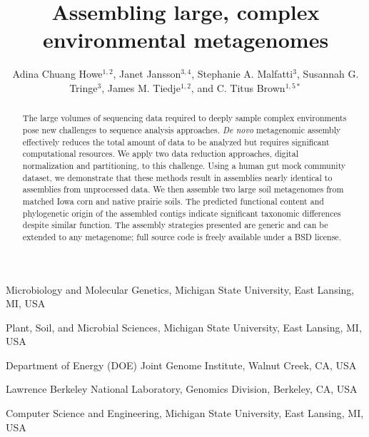 \documentclass{nature}%
\title{Assembling large, complex environmental metagenomes}
\author{Adina Chuang Howe$^{1,2}$, 
Janet Jansson$^{3,4}$,
Stephanie A. Malfatti$^{3}$,
Susannah G. Tringe$^{3}$,
James M. Tiedje$^{1,2}$, and 
C. Titus Brown$^{1,5\ast}$}
\begin{document}
\maketitle

\begin{affiliations}
\item Microbiology and Molecular Genetics, Michigan State University, East Lansing, MI, USA\\
\item Plant, Soil, and Microbial Sciences, Michigan State University, East Lansing, MI, USA\\
\item Department of Energy (DOE) Joint Genome Institute, Walnut Creek, CA, USA\\
\item Lawrence Berkeley National Laboratory, Genomics Division, Berkeley, CA, USA\\
\item Computer Science and Engineering, Michigan State University, East Lansing, MI, USA\\
\end{affiliations}

\begin{abstract}
The large volumes of sequencing data required to deeply sample complex
environments pose new challenges to sequence analysis approaches.
\emph{De novo} metagenomic assembly effectively reduces the total
amount of data to be analyzed but requires significant computational
resources.  We apply two data reduction approaches, digital
normalization and partitioning, to this challenge.  Using a human gut
mock community dataset, we demonstrate that these methods result in
assemblies nearly identical to assemblies from unprocessed data.  We
then assemble two large soil metagenomes from matched Iowa corn and
native prairie soils.  The predicted functional content and phylogenetic
origin of the assembled contigs indicate significant taxonomic
differences despite similar function.  The assembly strategies
presented are generic and can be extended to any metagenome; full
source code is freely available under a BSD
license.
\end{abstract}
\end{document}
